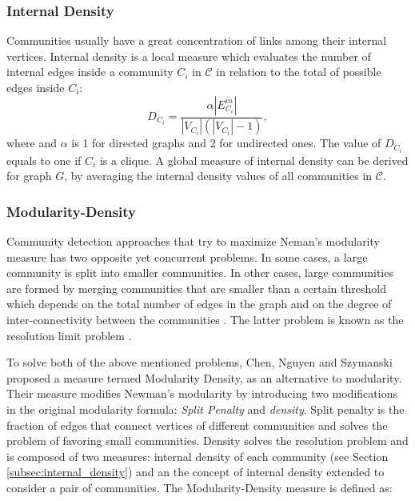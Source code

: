 \subsubsection*{Internal Density}
\label{subsec:internal_density}
Communities usually have a great concentration of links among their internal vertices. Internal density is a local measure which evaluates the number of internal edges inside a community $C_i$ in $\mathcal{C}$ in relation to the total of possible edges inside $C_i$:
\begin{equation}\label{eq:intDensity}
D_{C_i} =\frac{\alpha|E_{C_i}^{in}|}{|V_{C_i}|(|V_{C_i}|-1)}, 
\end{equation} 
where  and $\alpha$ is 1 for directed graphs and 2 for undirected ones. The value of $D_{C_i}$ equals to one if $C_i$ is a clique. A global measure of internal density can be derived for graph $G$, by averaging the internal density values of all communities in $\mathcal{C}$.


\subsubsection*{Modularity-Density}
\label{subsec:modularity_density}
Community detection approaches  that try to maximize Neman{'}s modularity measure has two opposite yet concurrent problems. In
some cases,  a large community is  split into smaller communities. In other cases,  large communities  are formed by merging communities that are smaller than a certain threshold which depends on the total number of edges in the graph and on the degree of inter-connectivity between the communities \cite{Szymanski2013}. The latter problem is known as the resolution limit problem \cite{Fortunato36}. 

To solve both of the above mentioned problems, Chen, Nguyen and Szymanski \cite{Szymanski2013} proposed a measure termed  Modularity Density, as an alternative to modularity. 
Their measure modifies Newman{'}s modularity by introducing  two modifications in the original modularity formula: {\em Split Penalty} and {\em density}. Split penalty is the fraction of edges that connect vertices of different communities and solves the problem of favoring small communities. Density solves the resolution problem and is composed of two measures: internal density of each community (see Section \ref{subsec:internal_density}) and an the concept of internal density extended to consider a pair of communities. The Modularity-Density measure is defined as:

